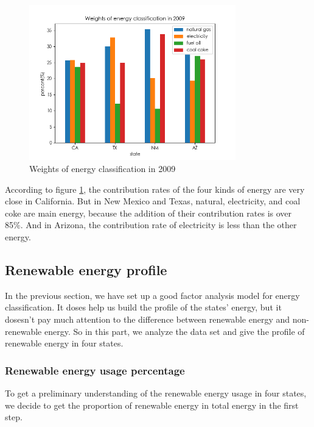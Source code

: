 \documentclass[a4paper,11pt]{article}
\begin{document}
\begin{figure}[H] 
    \centering 
    \includegraphics[width=0.8\textwidth]{./Pic/1-1.png}
    \caption{Weights of energy classification in 2009}
    \label{fig:1-1}
\end{figure}

\par According to figure \ref{fig:1-1}, the contribution rates of the four kinds of energy are very close in California. But in New Mexico and Texas, natural, electricity, and coal coke are main energy, because the addition of their contribution rates is over 85\%. And in Arizona, the contribution rate of electricity is less than the other energy. 

\subsection{Renewable energy profile}

\par In the previous section, we have set up a good factor analysis model for energy classification. It doses help us build the profile of the states' energy, but it dosesn't pay much attention to the difference between renewable energy and non-renewable energy. So in this part, we analyze the data set and give the profile of renewable energy in four states.

\subsubsection{Renewable energy usage percentage}
\par To get a preliminary understanding of the renewable energy usage in four states, we decide to get the proportion of renewable energy in total energy in the first step.
\end{document}
